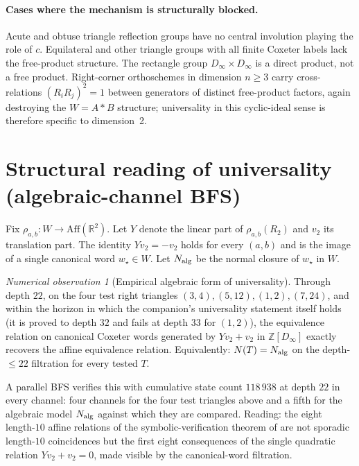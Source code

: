 \documentclass[11pt,a4paper]{article}
\theoremstyle{remark}
\newtheorem{observation}{Numerical observation}
\theoremstyle{plain}
\begin{document}
\paragraph{Cases where the mechanism is structurally blocked.}  Acute
and obtuse triangle reflection groups have no central involution
playing the role of $c$.  Equilateral and other triangle groups with
all finite Coxeter labels lack the free-product structure.  The
rectangle group $D_\infty \times D_\infty$ is a direct product, not a
free product.  Right-corner orthoschemes in dimension $n \ge 3$ carry
cross-relations $(R_i R_j)^2 = 1$ between generators of distinct
free-product factors, again destroying the $W = A * B$ structure;
universality in this cyclic-ideal sense is therefore specific to
dimension~2.

\section{Structural reading of universality (algebraic-channel BFS)}
\label{sec:univ-algebraic}

Fix $\rho_{a,b}: W \to \mathrm{Aff}(\mathbb{R}^2)$.  Let $Y$ denote the
linear part of $\rho_{a,b}(R_2)$ and $v_2$ its translation part.  The
identity $Y v_2 = -v_2$ holds for every $(a, b)$ and is the image of a
single canonical word $w_\star \in W$.  Let $N_{\rm alg}$ be the normal
closure of $w_\star$ in $W$.

\begin{observation}[Empirical algebraic form of universality]
\label{obs:alg-structural}
Through depth $22$, on the four test right triangles $(3, 4), (5, 12),
(1, 2), (7, 24)$, and within the horizon in which the companion's
universality statement itself holds (it is proved to depth $32$ and
fails at depth $33$ for $(1,2)$), the equivalence relation on canonical Coxeter words
generated by $Y v_2 + v_2$ in $\mathbb{Z}[D_\infty]$ exactly recovers
the affine equivalence relation.  Equivalently: $N(T) = N_{\rm alg}$ on
the depth-$\le 22$ filtration for every tested $T$.
\end{observation}

A parallel BFS verifies this with cumulative state count $118\,938$ at
depth $22$ in every channel: four channels for the four test triangles
above and a fifth for the algebraic model $N_{\rm alg}$ against which
they are compared.  Reading: the eight
length-$10$ affine relations of the symbolic-verification theorem of \cite{Bonfioli2} are not
sporadic length-$10$ coincidences but the first eight consequences of
the single quadratic relation $Y v_2 + v_2 = 0$, made visible by the
canonical-word filtration.
\end{document}
